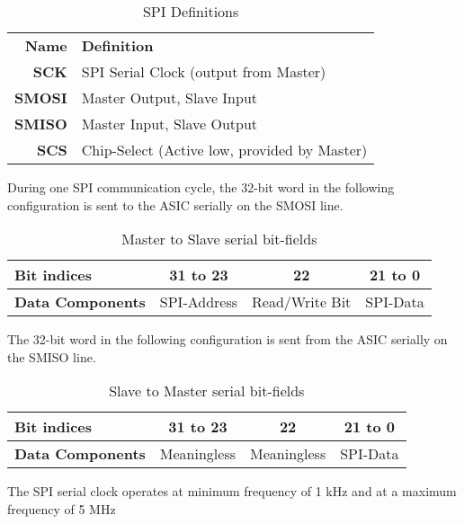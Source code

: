 \begin{table}[H]

\caption[]{SPI Definitions}
    \label{tab:1}
    
  \begin{center}  
  \begin{tabular}{|r|l|}
  \hline
  \textbf{Name}  & \textbf{Definition} \\ \cline{1-2}
  
  \textbf{SCK} & SPI Serial Clock (output from Master) \\
  \textbf{SMOSI} &Master Output, Slave Input \\ 
  \textbf{SMISO} &Master Input, Slave Output\\
  \textbf{SCS} &Chip-Select (Active low, provided by Master)\\
  \hline
  
\end{tabular}
\end{center}
\end{table}


During one SPI communication cycle, the 32-bit word in the following configuration is sent to the ASIC serially on the SMOSI line.

\begin{table}[H]

\caption[]{Master to Slave serial bit-fields}
    \label{tab:2}
    
  \begin{center}  
  \begin{tabular}{|l|c|c|c|}
  \hline
  \textbf{Bit indices}  & 31 to 23  & 22 & 21 to 0\\ 
  \hline
  \textbf{Data Components} & SPI-Address & Read/Write Bit & SPI-Data \\
  \hline
  
\end{tabular}
\end{center}
\end{table}

The 32-bit word in the following configuration is sent from the ASIC serially on the SMISO line.

\begin{table}[H]

\caption[]{Slave to Master serial bit-fields}
    \label{tab:3}
    
  \begin{center}  
  \begin{tabular}{|l|c|c|c|}
  \hline
  \textbf{Bit indices}  & 31 to 23  & 22 & 21 to 0\\ 
  \hline
  \textbf{Data Components} & Meaningless & Meaningless & SPI-Data \\
  \hline
  
\end{tabular}
\end{center}
\end{table}
The SPI serial clock operates at minimum frequency of 1 kHz and at a maximum frequency of 5 MHz

